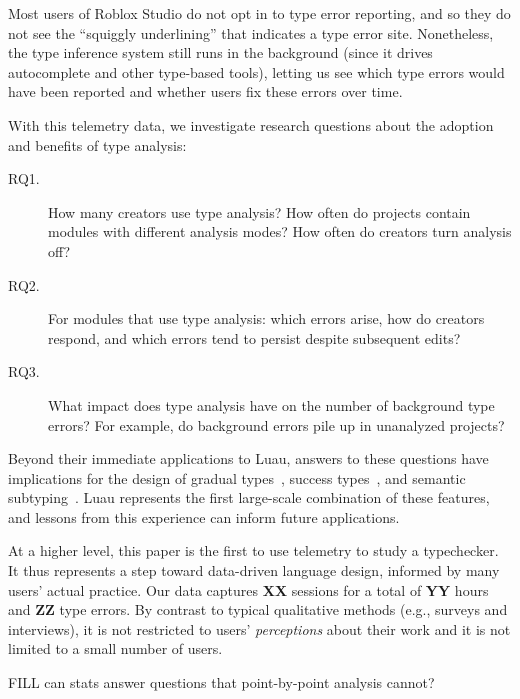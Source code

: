 \documentclass[english,submission,cleveref]{programming}
\begin{document}
Most users of {Roblox Studio} do not opt in to type error
reporting, and so they do not see the ``squiggly underlining'' that
indicates a type error site. Nonetheless, the type inference system
still runs in the background (since it drives autocomplete and other
type-based tools), letting us see which type errors would have
been reported and whether users fix these errors over time.

With this telemetry data, we investigate research questions about
the adoption and benefits of type analysis:
\begin{description}
  \item[RQ1.]
    How many creators use type analysis?
    How often do projects contain modules with different
    analysis modes?
    How often do creators turn analysis off?
  \item[RQ2.]
    For modules that use type analysis:
    which errors arise,
    how do creators respond,
    and which errors tend to persist despite subsequent edits?
  \item[RQ3.]
    What impact does type analysis have on the number of background type
    errors?
    For example, do background errors pile up in unanalyzed projects?
\end{description}

Beyond their immediate applications to {Luau},
answers to these questions have implications for the design
of gradual types~\cite{st-sfp-2006}, success types~\cite{lindahl2006practical},
and semantic subtyping~\cite{CF05:GentleIntroduction,Jef22:SemanticSubtyping}.
Luau represents the first large-scale combination of these features,
and lessons from this experience can inform future applications.

At a higher level, this paper is the first to use telemetry 
to study a typechecker.
It thus represents a step toward data-driven language design,
informed by many users' actual practice.
Our data captures \textbf{XX} sessions
for a total of \textbf{YY} hours
and \textbf{ZZ} type errors.
By contrast to typical qualitative methods (e.g., surveys and interviews), it
is not restricted to users' \emph{perceptions} about their work and it is not
limited to a small number of users.

FILL can stats answer questions that point-by-point analysis cannot?
\end{document}

